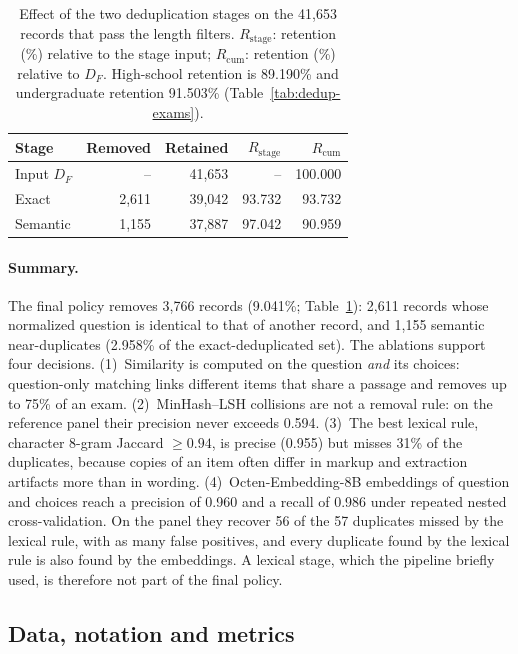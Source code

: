 \begin{table}[t]
\centering
\footnotesize
\setlength{\tabcolsep}{4pt}
\begin{tabular}{@{}lrrrr@{}}
\toprule
Stage & Removed & Retained & $R_{\mathrm{stage}}$ & $R_{\mathrm{cum}}$ \\
\midrule
Input $D_F$ & -- & 41,653 & -- & 100.000 \\
Exact & 2,611 & 39,042 & 93.732 & 93.732 \\
Semantic & 1,155 & 37,887 & 97.042 & 90.959 \\
\bottomrule
\end{tabular}
\caption{Effect of the two deduplication stages on the 41,653 records that
pass the length filters. $R_{\mathrm{stage}}$: retention (\%) relative to the
stage input; $R_{\mathrm{cum}}$: retention (\%) relative to $D_F$.
High-school retention is 89.190\% and undergraduate retention 91.503\%
(Table~\ref{tab:dedup-exams}).}
\label{tab:dedup-overview}
\end{table}

\paragraph{Summary.} The final policy removes 3,766 records (9.041\%;
Table~\ref{tab:dedup-overview}): 2,611 records whose normalized question is
identical to that of another record, and 1,155 semantic near-duplicates
(2.958\% of the exact-deduplicated set). The ablations support four decisions.
(1)~Similarity is computed on the question \emph{and} its choices:
question-only matching links different items that share a passage and removes
up to 75\% of an exam. (2)~MinHash--LSH collisions are not a removal rule: on
the reference panel their precision never exceeds 0.594. (3)~The best lexical
rule, character 8-gram Jaccard $\ge 0.94$, is precise (0.955) but misses 31\%
of the duplicates, because copies of an item often differ in markup and
extraction artifacts more than in wording. (4)~Octen-Embedding-8B embeddings
of question and choices reach a precision of 0.960 and a recall of 0.986 under
repeated nested cross-validation. On the panel they recover 56 of the 57
duplicates missed by the lexical rule, with as many false positives, and every
duplicate found by the lexical rule is also found by the embeddings. A lexical
stage, which the pipeline briefly used, is therefore not part of the final
policy.

\subsection{Data, notation and metrics}
\label{app:dedup-setup}

